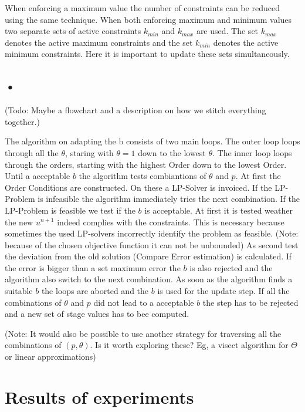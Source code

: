 \documentclass{article}
\begin{document}
When enforcing a maximum value the number of constraints can be reduced using the same technique. When both enforcing maximum and minimum values two separate sets of active constraints $k_{min}$ and $k_{max}$ are used. The set $k_{max}$ denotes the active maximum constraints and the set $k_{min}$ denotes the active minimum constraints. 
Here it is important to update these sets simultaneously.  

\subsection{•}
(Todo: Maybe a flowchart and a description on how we stitch everything together.) 

The algorithm on adapting the b consists of two main loops. The outer loop loops through all the $\theta$, staring with $\theta = 1$ down to the lowest $\theta$. The inner loop loops through the orders, starting with the highest Order down to the lowest Order. 
Until a acceptable $b$ the algorithm tests combiantions of $\theta$ and $p$. At first the Order Conditions are constructed. On these a LP-Solver is invoiced. If the LP-Problem is infeasible the algorithm immediately tries the next combination. If the LP-Problem is feasible we test if the $b$ is acceptable. At first it is tested weather the new $u^{n+1}$ indeed complies with the constraints. This is necessary because sometimes the used LP-solvers incorrectly identify the problem as feasible. (Note: because of the chosen objective function it can not be unbounded) As second test the deviation from the old solution (Compare Error estimation) is calculated. If the error is bigger than a set maximum error the $b$ is also rejected and the algorithm also switch to the next combination.
As soon as the algorithm finds a suitable $b$ the loops are aborted and the $b$ is used for the update step.
If all the combinations of $\theta$ and $p$ did not lead to a acceptable $b$ the step has to be rejected and a new set of stage values has to bee computed.

(Note: It would also be possible to use another strategy for traversing all the combinations of $(p,\theta)$. Is it worth exploring these? Eg, a visect algorithm for $\Theta$ or linear approximations)



\section{Results of experiments}\label{sec:Numeric_Results}
\end{document}
